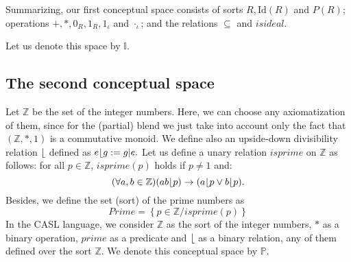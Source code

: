Summarizing, our first conceptual space consists of sorts $R,
\textrm{Id}(R)$ and $P(R)$; operations $+, *, 0_R, 1_R, 1_{\iota}$ and
$ \cdot_{\iota}$; and the relations $\subseteq$ and $isideal$.



 
Let us denote this space by $\mathbb{I}$.

\subsection{The second conceptual space}
Let $\mathbb{Z}$ be the set of the integer numbers. Here, we can
choose any axiomatization of them, since for the (partial) blend we
just take into account only the fact that $(\mathbb{Z},*,1)$ is a
commutative monoid.
We define also an upside-down divisibility relation $\lfloor$ defined as
%
$e\lfloor g:=g|e.$
Let us define a unary relation $isprime$ on $\mathbb{Z}$ as
follows: for all $p\in \mathbb{Z}$, $isprime(p)$ holds if $p\neq 1$
and:
%
\[(\forall a,b\in \mathbb{Z})(ab \lfloor p)\rightarrow (a \lfloor p \vee b \lfloor p).\] 
Besides, we define the set (sort) of the prime numbers as 
\[ Prime=\left\{ p\in \mathbb{Z}/ isprime(p)\right\}\]
In the CASL language, we consider
$\mathbb{Z}$ as the sort of the integer numbers, $*$ as a binary
operation, $prime$ as a predicate and $\lfloor$ as a binary
relation, any of them defined over the sort $\mathbb{Z}$.
We denote this conceptual space by $\mathbb{P}$.


